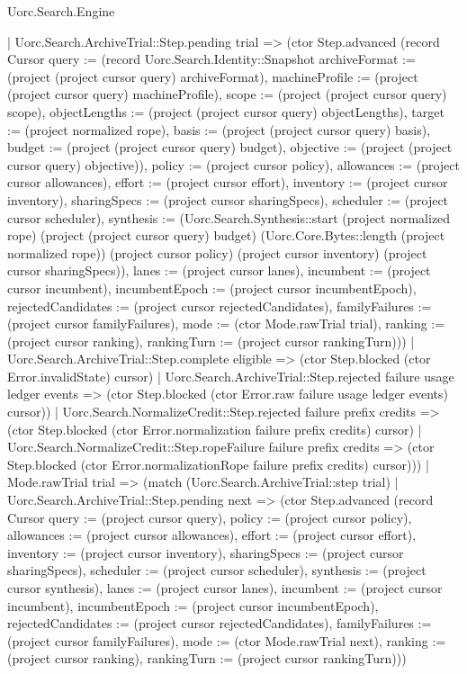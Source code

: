 \begin{lexlean}{Uorc.Search.Engine}
\begin{semanticmodule}
{          | Uorc.Search.ArchiveTrial::Step.pending trial => (ctor Step.advanced (record Cursor {query := (record Uorc.Search.Identity::Snapshot {archiveFormat := (project (project cursor query) archiveFormat), machineProfile := (project (project cursor query) machineProfile), scope := (project (project cursor query) scope), objectLengths := (project (project cursor query) objectLengths), target := (project normalized rope), basis := (project (project cursor query) basis), budget := (project (project cursor query) budget), objective := (project (project cursor query) objective)}), policy := (project cursor policy), allowances := (project cursor allowances), effort := (project cursor effort), inventory := (project cursor inventory), sharingSpecs := (project cursor sharingSpecs), scheduler := (project cursor scheduler), synthesis := (Uorc.Search.Synthesis::start (project normalized rope) (project (project cursor query) budget) (Uorc.Core.Bytes::length (project normalized rope)) (project cursor policy) (project cursor inventory) (project cursor sharingSpecs)), lanes := (project cursor lanes), incumbent := (project cursor incumbent), incumbentEpoch := (project cursor incumbentEpoch), rejectedCandidates := (project cursor rejectedCandidates), familyFailures := (project cursor familyFailures), mode := (ctor Mode.rawTrial trial), ranking := (project cursor ranking), rankingTurn := (project cursor rankingTurn)}))
          | Uorc.Search.ArchiveTrial::Step.complete eligible => (ctor Step.blocked (ctor Error.invalidState) cursor)
          | Uorc.Search.ArchiveTrial::Step.rejected failure usage ledger events => (ctor Step.blocked (ctor Error.raw failure usage ledger events) cursor))
        | Uorc.Search.NormalizeCredit::Step.rejected failure prefix credits => (ctor Step.blocked (ctor Error.normalization failure prefix credits) cursor)
        | Uorc.Search.NormalizeCredit::Step.ropeFailure failure prefix credits => (ctor Step.blocked (ctor Error.normalizationRope failure prefix credits) cursor)))
    | Mode.rawTrial trial => (match (Uorc.Search.ArchiveTrial::step trial)
      | Uorc.Search.ArchiveTrial::Step.pending next => (ctor Step.advanced (record Cursor {query := (project cursor query), policy := (project cursor policy), allowances := (project cursor allowances), effort := (project cursor effort), inventory := (project cursor inventory), sharingSpecs := (project cursor sharingSpecs), scheduler := (project cursor scheduler), synthesis := (project cursor synthesis), lanes := (project cursor lanes), incumbent := (project cursor incumbent), incumbentEpoch := (project cursor incumbentEpoch), rejectedCandidates := (project cursor rejectedCandidates), familyFailures := (project cursor familyFailures), mode := (ctor Mode.rawTrial next), ranking := (project cursor ranking), rankingTurn := (project cursor rankingTurn)}))
}
\end{semanticmodule}
\end{lexlean}
